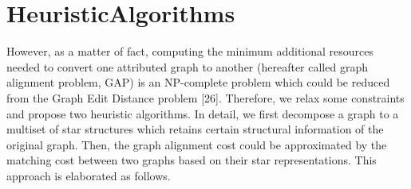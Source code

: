 \section{HeuristicAlgorithms}
However, as a matter of fact, computing the minimum additional
resources needed to convert one attributed graph to
another (hereafter called graph alignment problem, GAP) is an
NP-complete problem which could be reduced from the Graph
Edit Distance problem [26]. Therefore, we relax some constraints
and propose two heuristic algorithms. In detail, we first
decompose a graph to a multiset of star structures which retains
certain structural information of the original graph. Then, the
graph alignment cost could be approximated by the matching
cost between two graphs based on their star representations.
This approach is elaborated as follows.